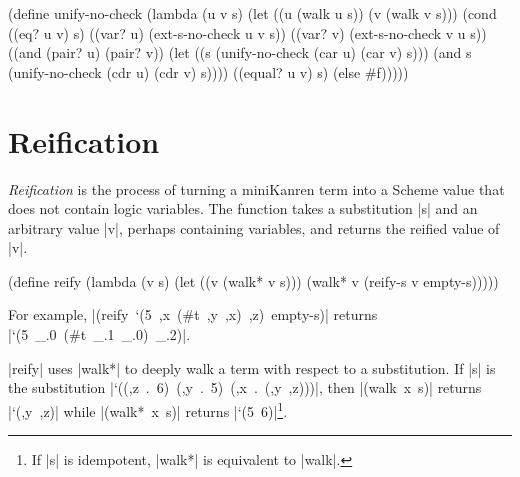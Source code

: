 \newpage

\begin{schemedisplay}
(define unify-no-check
  (lambda (u v s)
    (let ((u (walk u s))
          (v (walk v s)))
      (cond
        ((eq? u v) s)
        ((var? u) (ext-s-no-check u v s))
        ((var? v) (ext-s-no-check v u s))
        ((and (pair? u) (pair? v))
         (let ((s (unify-no-check (car u) (car v) s)))
           (and s (unify-no-check (cdr u) (cdr v) s))))
        ((equal? u v) s)
        (else #f)))))                                                    
\end{schemedisplay}




\section{Reification}\label{mkreification}
\enlargethispage{1em}

\emph{Reification} is the process of turning a miniKanren term into a
Scheme value that does not contain logic variables.
The  function takes a substitution \scheme|s| and an arbitrary value \scheme|v|,
perhaps containing variables, and returns the reified value of \scheme|v|. 

\schemedisplayspace
\begin{schemedisplay}
(define reify
  (lambda (v s)
    (let ((v (walk* v s)))
      (walk* v (reify-s v empty-s)))))
\end{schemedisplay}

\noindent For example, \mbox{\scheme|(reify `(5 ,x (#t ,y ,x) ,z) empty-s)|}
returns \mbox{\scheme|`(5 _.0 (#t _.1 _.0) _.2)|}.


\scheme|reify| uses \scheme|walk*| to deeply walk a term with respect
to a substitution.  If \scheme|s| is the substitution
\mbox{\scheme|`((,z . 6) (,y . 5) (,x . (,y ,z)))|}, then
\mbox{\scheme|(walk x s)|} returns \mbox{\scheme|`(,y ,z)|} while
\mbox{\scheme|(walk* x s)|} returns \mbox{\scheme|`(5 6)|}\footnote{If \scheme|s| is idempotent, \scheme|walk*| is equivalent to \scheme|walk|.}.

